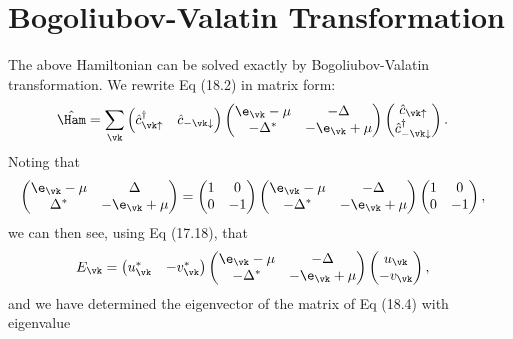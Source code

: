 \documentclass[a4paper, 11pt, normalem]{report}
\begin{document}
\section{Bogoliubov-Valatin Transformation}
The above Hamiltonian can be solved exactly by Bogoliubov-Valatin transformation.
We rewrite Eq (18.2) in matrix form:
\begin{align}
    \hat{\Ham} &= \sum_{\vk}\begin{pmatrix} \hat{c}_{\vk\uparrow}^\dagger & \hat{c}_{-\vk\downarrow}\end{pmatrix} \begin{pmatrix} \e_{\vk}-\mu & -\Delta \\ -\Delta^* & -\e_{\vk}+\mu \end{pmatrix}\begin{pmatrix} \hat{c}_{\vk\uparrow} \\ \hat{c}_{-\vk\downarrow}^\dagger\end{pmatrix}.
\end{align}
Noting that
\begin{align}
    \begin{pmatrix} \e_{\vk}-\mu & \Delta \\ \Delta^* & -\e_{\vk}+\mu \end{pmatrix} &= \begin{pmatrix} 1 & 0 \\ 0 & -1 \end{pmatrix}\begin{pmatrix} \e_{\vk}-\mu & -\Delta \\ -\Delta^* & -\e_{\vk}+\mu\end{pmatrix}\begin{pmatrix}1&0\\0&-1\end{pmatrix},
\end{align}
we can then see, using Eq (17.18), that
\begin{align}
    E_{\vk} &= \begin{pmatrix} u_{\vk}^* & -v_{\vk}^*\end{pmatrix}\begin{pmatrix} \e_{\vk}-\mu & -\Delta \\ -\Delta^* & -\e_{\vk}+\mu \end{pmatrix}\begin{pmatrix}u_{\vk} \\-v_{\vk}\end{pmatrix},
\end{align}
and we have determined the eigenvector of the matrix of Eq (18.4) with eigenvalue
\end{document}
